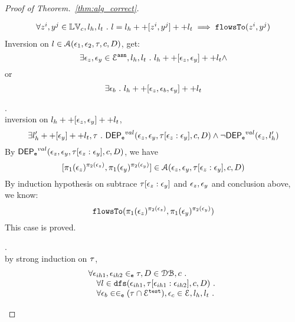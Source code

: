 \begin{proof}[Proof of Theorem.~\ref{thm:alg_correct}]
\begin{case}
\[\begin{array}{l}
   \forall z^i, y^j \in \mathbb{LV}_c, l_h, l_t ~.~ 
   l = l_h ++ [z^i, y^j] ++ l_t 
   \implies \mathtt{flowsTo}(z^i, y^j)  
\end{array}
\]
%
Inversion on $l \in \mathcal{A}(\mathtt{\epsilon}_1, \mathtt{\epsilon}_2, \mathtt{\tau}, c, D)$, get:
\[
  \exists \mathtt{\epsilon}_z, \mathtt{\epsilon}_y \in \mathcal{E}^{\mathtt{{asn}}}, l_h, l_t 
  ~.~ l_h ++ [\mathtt{\epsilon}_z, \mathtt{\epsilon}_y] ++ l_t \land 
\]
or
\[
    \exists \mathtt{\epsilon}_b ~.~ l_h ++ [\mathtt{\epsilon}_z, \mathtt{\epsilon}_b, \mathtt{\epsilon}_y] ++ l_t
\]
\begin{subcase}.
\\
inversion on  $l_h ++ {[\mathtt{\epsilon}_z, \mathtt{\epsilon}_y]} ++ l_t$, 
\[
  \exists l_{h}' ++ [\mathtt{\epsilon}_y] ++ l_t, \mathtt{\tau} ~.~
  \mathsf{DEP_{\mathtt{e}}}^{val}(\mathtt{\epsilon}_z, \mathtt{\epsilon}_y, \mathtt{\tau}[\mathtt{\epsilon}_z: \mathtt{\epsilon}_y], c, D)
  \land 
  \neg \mathsf{DEP_{\mathtt{e}}}^{val} (\mathtt{\epsilon}_z, l_h')
\]
%
By $\mathsf{DEP_{\mathtt{e}}}^{val}(\mathtt{\epsilon}_z, \mathtt{\epsilon}_y, \mathtt{\tau}[\mathtt{\epsilon}_z: \mathtt{\epsilon}_y], c, D)$, 
we have
\[
  [\pi_1(\mathtt{\epsilon}_z)^{\pi_2(\mathtt{\epsilon}_z)}, \pi_1(\mathtt{\epsilon}_y)^{\pi_2(\mathtt{\epsilon}_y)}] 
  \in \mathcal{A}(\mathtt{\epsilon}_z, \mathtt{\epsilon}_y, \mathtt{\tau}[\mathtt{\epsilon}_{z}:\mathtt{\epsilon}_{y}], c, D) 
\]
%
By induction hypothesis on subtrace $\mathtt{\tau}[\mathtt{\epsilon}_z: \mathtt{\epsilon}_y]$ and $\mathtt{\epsilon}_z, \mathtt{\epsilon}_y$ and conclusion above, we know:
\[
  \mathtt{flowsTo}(\pi_1(\mathtt{\epsilon}_z)^{\pi_2(\mathtt{\epsilon}_z)}, \pi_1(\mathtt{\epsilon}_y)^{\pi_2(\mathtt{\epsilon}_y)})
\]
This case is proved.
%
%
\end{subcase}
%
\begin{subcase}.
\\
by strong induction on $\mathtt{\tau}$,
\[
\begin{array}{l}
  \forall \mathtt{\epsilon}_{ih1}, \mathtt{\epsilon}_{ih2} \in_{\mathtt{e}} \mathtt{\tau}, D \in \mathcal{DB} , c ~.~
  \\ \quad 
   \forall l \in \mathtt{dfs}(\mathtt{\epsilon}_{ih1}, \mathtt{\tau}[\mathtt{\epsilon}_{ih1}:\mathtt{\epsilon}_{ih2}], c, D) ~.~
   \\ \quad 
   \forall \mathtt{\epsilon}_b \in \in_{\mathtt{e}} (\mathtt{\tau} \cap \mathcal{E}^{\mathtt{{test}}}), \mathtt{\epsilon}_c \in \mathcal{E}, l_h, l_t ~.~ 

\end{array}\]
\end{subcase}
\end{case}
\end{proof}
